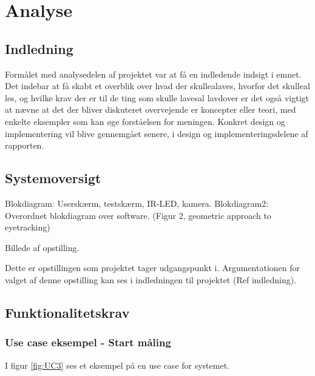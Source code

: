 \documentclass[rapport.tex]{subfiles}
\begin{document}
\section{Analyse}
	\subsection{Indledning}
	Formålet med analysedelen af projektet var at få en indledende indsigt i emnet. Det indebar at få skabt et overblik over hvad der skullealaves, hvorfor det skulleal les, og hvilke krav der er til de ting som skulle lavesal lavdover er det også vigtigt at nævne at det der bliver diskuteret overvejende er koncepter eller teori, med enkelte eksempler som kan øge forståelsen for meningen. Konkret design og implementering vil blive gennemgået senere, i design og implementeringsdelene af rapporten.
	\subsection{Systemoversigt}
	
	Blokdiagram: Userskærm, testskærm, IR-LED, kamera.
	Blokdiagram2: Overordnet blokdiagram over software. (Figur 2, geometric approach to eyetracking)
	
	Billede af opstilling.
	
	
	
	
	Dette er opstillingen som projektet tager udgangspunkt i. Argumentationen for	valget af denne opstilling kan ses i indledningen til projektet (Ref indledning).
	
	\subsection{Funktionalitetskrav}
	
		\subsubsection{Use case eksempel - Start måling}
		I figur \ref{fig:UC3} ses et eksempel på en use case for systemet. 
		
\end{document}
